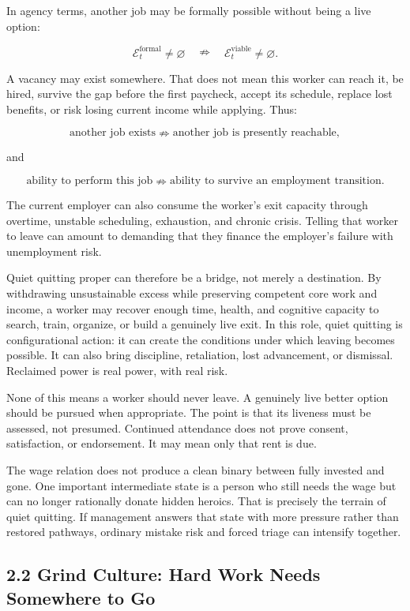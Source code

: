 \documentclass[11pt,oneside]{article}
\begin{document}
In agency terms, another job may be formally possible without being a
live option:

\[
\mathcal E_t^{\mathrm{formal}}\neq\varnothing
\quad\nRightarrow\quad
\mathcal E_t^{\mathrm{viable}}\neq\varnothing.
\]

A vacancy may exist somewhere. That does not mean this worker can reach
it, be hired, survive the gap before the first paycheck, accept its
schedule, replace lost benefits, or risk losing current income while
applying. Thus:

\[
\text{another job exists}
\nRightarrow
\text{another job is presently reachable},
\]

and

\[
\text{ability to perform this job}
\nRightarrow
\text{ability to survive an employment transition}.
\]

The current employer can also consume the worker's exit capacity through
overtime, unstable scheduling, exhaustion, and chronic crisis. Telling
that worker to leave can amount to demanding that they finance the
employer's failure with unemployment risk.

Quiet quitting proper can therefore be a bridge, not merely a
destination. By withdrawing unsustainable excess while preserving
competent core work and income, a worker may recover enough time,
health, and cognitive capacity to search, train, organize, or build a
genuinely live exit. In this role, quiet quitting is configurational
action: it can create the conditions under which leaving becomes
possible. It can also bring discipline, retaliation, lost advancement,
or dismissal. Reclaimed power is real power, with real risk.

None of this means a worker should never leave. A genuinely live better
option should be pursued when appropriate. The point is that its
liveness must be assessed, not presumed. Continued attendance does not
prove consent, satisfaction, or endorsement. It may mean only that rent
is due.

The wage relation does not produce a clean binary between fully invested
and gone. One important intermediate state is a person who still needs
the wage but can no longer rationally donate hidden heroics. That is
precisely the terrain of quiet quitting. If management answers that
state with more pressure rather than restored pathways, ordinary mistake
risk and forced triage can intensify together.

\hypertarget{grind-culture-hard-work-needs-somewhere-to-go}{%
\subsection{2.2 Grind Culture: Hard Work Needs Somewhere to
Go}\label{grind-culture-hard-work-needs-somewhere-to-go}}
\end{document}
